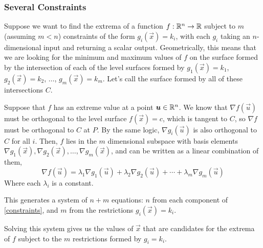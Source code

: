 \subsubsection{Several Constraints}
Suppose we want to find the extrema of a function \(f: \mathbb{R}^n\to \mathbb{R}\) subject to \(m\) (assuming \(m<n\)) constraints of the form \(g_i(\vec x) = k_i\), with each \(g_i\) taking an \(n\)-dimensional input and returning a scalar output. Geometrically, this means that we are looking for the minimum and maximum values of \(f\) on the surface formed by the intersection of each of the level surfaces formed by \(g_1(\vec x) = k_1\), \(g_2(\vec x) = k_2\), \(\dots\), \(g_m(\vec x) = k_m\). Let's call the surface formed by all of these intersections \(C\). \par
Suppose that \(f\) has an extreme value at a point \(\boldsymbol{u}\in\mathbb{R}^n\). We know that \(\nabla f(\vec u)\) must be orthogonal to the level surface \(f(\vec x)=c\), which is tangent to \(C\), so \(\nabla f\) must be orthogonal to \(C\) at \(P\). By the same logic, \(\nabla g_i(\vec u)\) is also orthogonal to \(C\) for all \(i\). Then, \(f\) lies in the \(m\) dimensional subspace with basis elements \(\nabla g_1(\vec x), \nabla g_2(\vec x), \dots, \nabla g_m(\vec x)\), and can be written as a linear combination of them,
\begin{equation}\label{constraints}
    \nabla f(\vec u) = \lambda_1 \nabla g_1(\vec u) + \lambda_2\nabla g_2(\vec u)+\cdots + \lambda_m\nabla g_m(\vec u)
\end{equation}
Where each \(\lambda_i\) is a constant.\par This generates a system of \(n+m\) equations: \(n\) from each component of \ref{constraints}, and \(m\) from the restrictions \(g_i(\vec x) = k_i\). \par
Solving this system gives us the values of \(\vec x\) that are candidates for the extrema of \(f\) subject to the \(m\) restrictions formed by \(g_i=k_i\).